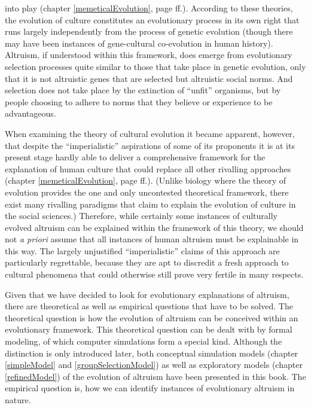 into play (chapter \ref{memeticalEvolution}, page
\pageref{memeticalEvolution}ff.). According to these theories, the evolution of
culture constitutes an evolutionary process in its own right that runs largely
independently from the process of genetic evolution (though there may have been
instances of gene-cultural co-evolution in human history). Altruism, if
understood within this framework, does emerge from evolutionary selection
processes quite similar to those that take place in genetic evolution, only
that it is not altruistic genes that are selected but altruistic social norms.
And selection does not take place by the extinction of ``unfit'' organisms, but
by people choosing to adhere to norms that they believe or experience to be
advantageous.

When examining the theory of cultural evolution it became apparent, however,
that despite the ``imperialistic'' aspirations of some of its proponents it is
at its present stage hardly able to deliver a comprehensive framework for the
explanation of human culture that could replace all other rivalling approaches
(chapter \ref{memeticalEvolution}, page
\pageref{culturalEvolutionCriticism}ff.). (Unlike biology where the
theory of evolution provides the one and only uncontested theoretical
framework, there exist many rivalling paradigms that claim to explain the
evolution of culture in the social sciences.) Therefore, while certainly some
instances of culturally evolved altruism can be explained within the framework
of this theory, we should not {\em a priori} assume that all instances of
human altruism must be explainable in this way. The largely unjustified
``imperialistic'' claims of this approach are particularly regrettable,
because they are apt to discredit a fresh approach to cultural phenomena that
could otherwise still prove very fertile in many respects.

Given that we have decided to look for evolutionary explanations of altruism,
there are theoretical as well as empirical questions that have to be solved.
The theoretical question is how the evolution of altruism can be conceived
within an evolutionary framework. This theoretical question can be dealt with
by formal modeling, of which computer simulations form a special kind.
Although the distinction is only introduced later, both conceptual simulation
models (chapter \ref{simpleModel} and \ref{groupSelectionModel}) as well as
exploratory models (chapter \ref{refinedModel}) of the evolution of altruism
have been presented in this book. The empirical question is, how we can
identify instances of evolutionary altruism in nature.

